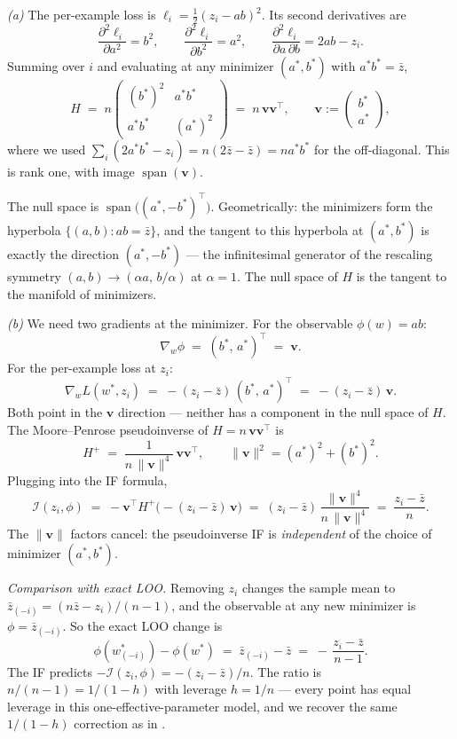 \documentclass[11pt]{article}
\begin{document}
\begin{solution}[ex:if-degenerate]

\textit{(a)} The per-example loss is $\ell_i = \tfrac12(z_i - ab)^2$. Its second derivatives are
\[
  \frac{\partial^2 \ell_i}{\partial a^2} = b^2,
  \qquad
  \frac{\partial^2 \ell_i}{\partial b^2} = a^2,
  \qquad
  \frac{\partial^2 \ell_i}{\partial a\,\partial b} = 2ab - z_i.
\]
Summing over $i$ and evaluating at any minimizer $(a^*,b^*)$ with $a^*b^* = \bar z$,
\[
  H \;=\; n\begin{pmatrix} (b^*)^2 & a^*b^* \\ a^*b^* & (a^*)^2 \end{pmatrix}
  \;=\; n\,\mathbf{v}\mathbf{v}^\top,
  \qquad \mathbf{v} := \begin{pmatrix}b^*\\a^*\end{pmatrix},
\]
where we used $\sum_i(2a^*b^* - z_i) = n(2\bar z - \bar z) = na^*b^*$ for the off-diagonal. This is rank one, with image $\operatorname{span}(\mathbf{v})$.

The null space is $\operatorname{span}\bigl((a^*,-b^*)^\top\bigr)$. Geometrically: the minimizers form the hyperbola $\{(a,b): ab = \bar z\}$, and the tangent to this hyperbola at $(a^*,b^*)$ is exactly the direction $(a^*,-b^*)$ --- the infinitesimal generator of the rescaling symmetry $(a,b)\to(\alpha a,\, b/\alpha)$ at $\alpha=1$. The null space of $H$ is the tangent to the manifold of minimizers.

\textit{(b)} We need two gradients at the minimizer. For the observable $\phi(w) = ab$:
\[
  \nabla_w\phi \;=\; (b^*,\,a^*)^\top \;=\; \mathbf{v}.
\]
For the per-example loss at $z_i$:
\[
  \nabla_w L(w^*,z_i) \;=\; -(z_i - \bar z)\,(b^*,\,a^*)^\top \;=\; -(z_i - \bar z)\,\mathbf{v}.
\]
Both point in the $\mathbf{v}$ direction --- neither has a component in the null space of $H$. The Moore--Penrose pseudoinverse of $H = n\,\mathbf{v}\mathbf{v}^\top$ is
\[
  H^+ \;=\; \frac{1}{n\,\|\mathbf{v}\|^4}\,\mathbf{v}\mathbf{v}^\top,
  \qquad \|\mathbf{v}\|^2 = (a^*)^2 + (b^*)^2.
\]
Plugging into the IF formula,
\[
  \mathcal{I}(z_i,\phi)
  \;=\; -\mathbf{v}^\top H^+\bigl(-(z_i-\bar z)\,\mathbf{v}\bigr)
  \;=\; (z_i - \bar z)\,\frac{\|\mathbf{v}\|^4}{n\,\|\mathbf{v}\|^4}
  \;=\; \frac{z_i - \bar z}{n}.
\]
The $\|\mathbf{v}\|$ factors cancel: the pseudoinverse IF is \emph{independent} of the choice of minimizer $(a^*,b^*)$.

\emph{Comparison with exact LOO.} Removing $z_i$ changes the sample mean to $\bar z_{(-i)} = (n\bar z - z_i)/(n-1)$, and the observable at any new minimizer is $\phi = \bar z_{(-i)}$. So the exact LOO change is
\[
  \phi(w^*_{(-i)}) - \phi(w^*) \;=\; \bar z_{(-i)} - \bar z \;=\; -\,\frac{z_i - \bar z}{n-1}.
\]
The IF predicts $-\mathcal{I}(z_i,\phi) = -(z_i-\bar z)/n$. The ratio is $n/(n-1) = 1/(1-h)$ with leverage $h = 1/n$ --- every point has equal leverage in this one-effective-parameter model, and we recover the same $1/(1-h)$ correction as in .


\end{solution}
\end{document}

